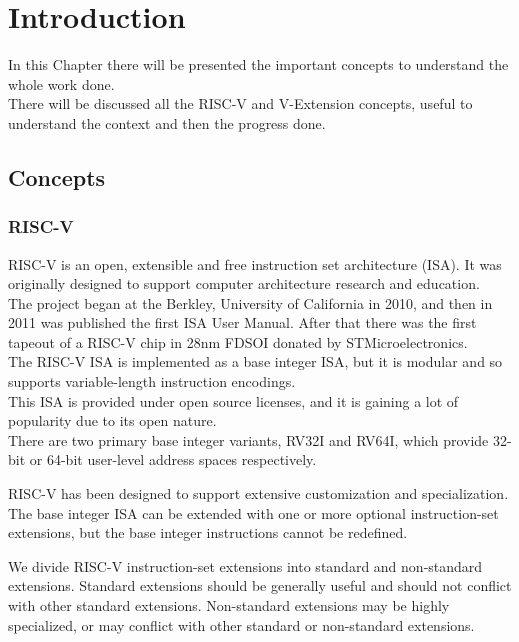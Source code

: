 \chapter{Introduction}
In this Chapter there will be presented the important concepts to understand the whole work done. \\
There will be discussed all the RISC-V and V-Extension concepts, useful to understand the context and then the progress done.\\

\section{Concepts}
\subsection{RISC-V}
RISC-V is an open, extensible and free instruction set architecture (ISA). It was originally designed to support computer architecture research and education\cite{RISC-V-Instruction-Set-Manual}.\\
The project began at the Berkley, University of California in 2010, and then in 2011 was published the first ISA User Manual. After that there was the first tapeout of a RISC-V chip in 28nm FDSOI donated by STMicroelectronics.\\

The RISC-V ISA is implemented as a base integer ISA, but it is modular and so supports  variable-length instruction encodings.\\
This ISA is provided under open source licenses, and it is gaining a lot of popularity due to its open nature. \\
There are two primary base integer variants, RV32I and RV64I, which provide 32-bit or 64-bit user-level address spaces respectively.

RISC-V has been designed to support extensive customization and specialization. The base integer ISA can be extended with one or more optional instruction-set extensions, but the base integer instructions cannot be redeﬁned.

We divide RISC-V instruction-set extensions into standard and non-standard extensions. Standard extensions should be generally useful and should not conﬂict with other standard extensions. Non-standard extensions may be highly specialized, or may conﬂict with other standard or non-standard extensions.

